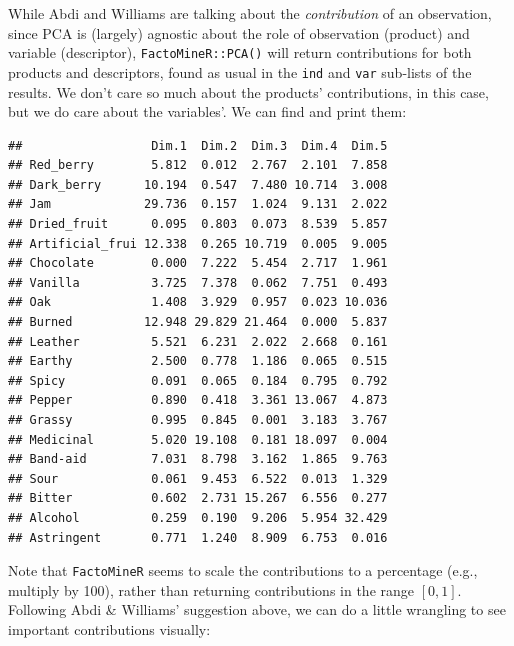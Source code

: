 \documentclass[
]{book}
\newenvironment{Shaded}{\begin{snugshade}}{\end{snugshade}}
\newcommand{\DecValTok}[1]{\textcolor[rgb]{0.00,0.00,0.81}{#1}}
\newcommand{\FunctionTok}[1]{\textcolor[rgb]{0.13,0.29,0.53}{\textbf{#1}}}
\newcommand{\NormalTok}[1]{#1}
\newcommand{\SpecialCharTok}[1]{\textcolor[rgb]{0.81,0.36,0.00}{\textbf{#1}}}
\begin{document}
While Abdi and Williams are talking about the \emph{contribution} of an observation, since PCA is (largely) agnostic about the role of observation (product) and variable (descriptor), \texttt{FactoMineR::PCA()} will return contributions for both products and descriptors, found as usual in the \texttt{ind} and \texttt{var} sub-lists of the results. We don't care so much about the products' contributions, in this case, but we do care about the variables'. We can find and print them:

\begin{Shaded}
\end{Shaded}

\begin{verbatim}
##                  Dim.1  Dim.2  Dim.3  Dim.4  Dim.5
## Red_berry        5.812  0.012  2.767  2.101  7.858
## Dark_berry      10.194  0.547  7.480 10.714  3.008
## Jam             29.736  0.157  1.024  9.131  2.022
## Dried_fruit      0.095  0.803  0.073  8.539  5.857
## Artificial_frui 12.338  0.265 10.719  0.005  9.005
## Chocolate        0.000  7.222  5.454  2.717  1.961
## Vanilla          3.725  7.378  0.062  7.751  0.493
## Oak              1.408  3.929  0.957  0.023 10.036
## Burned          12.948 29.829 21.464  0.000  5.837
## Leather          5.521  6.231  2.022  2.668  0.161
## Earthy           2.500  0.778  1.186  0.065  0.515
## Spicy            0.091  0.065  0.184  0.795  0.792
## Pepper           0.890  0.418  3.361 13.067  4.873
## Grassy           0.995  0.845  0.001  3.183  3.767
## Medicinal        5.020 19.108  0.181 18.097  0.004
## Band-aid         7.031  8.798  3.162  1.865  9.763
## Sour             0.061  9.453  6.522  0.013  1.329
## Bitter           0.602  2.731 15.267  6.556  0.277
## Alcohol          0.259  0.190  9.206  5.954 32.429
## Astringent       0.771  1.240  8.909  6.753  0.016
\end{verbatim}

Note that \texttt{FactoMineR} seems to scale the contributions to a percentage (e.g., multiply by 100), rather than returning contributions in the range \([0,1]\). Following Abdi \& Williams' suggestion above, we can do a little wrangling to see important contributions visually:
\end{document}
